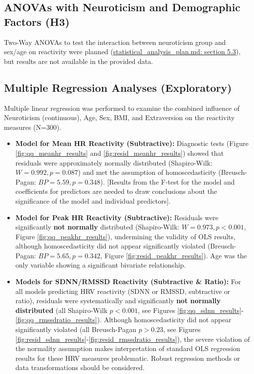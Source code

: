 \documentclass[11pt, a4paper]{report}
\newcommand{\mdcitesec}[2]{\href{run:./sources/#1}{\url{#1}: section #2}}
\begin{document}
\subsection{ANOVAs with Neuroticism and Demographic Factors (H3)}
\label{subsec:results_anova_add} %
Two-Way ANOVAs to test the interaction between neuroticism group and sex/age on reactivity were planned (\mdcitesec{statistical_analysis_plan.md}{5.3}), but results are not available in the provided data.

\subsection{Multiple Regression Analyses (Exploratory)}
\label{subsec:results_regression_add} %
Multiple linear regression was performed to examine the combined influence of Neuroticism (continuous), Age, Sex, BMI, and Extraversion on the reactivity measures (N=300).

\begin{itemize}
    \item \textbf{Model for Mean HR Reactivity (Subtractive):} Diagnostic tests (Figure \ref{fig:qq_meanhr_results} and \ref{fig:resid_meanhr_results}) showed that residuals were approximately normally distributed (Shapiro-Wilk: $W=0.992, p=0.087$) and met the assumption of homoscedasticity (Breusch-Pagan: $BP=5.59, p=0.348$). [Results from the F-test for the model and coefficients for predictors are needed to draw conclusions about the significance of the model and individual predictors].
    \item \textbf{Model for Peak HR Reactivity (Subtractive):} Residuals were significantly \textbf{not normally} distributed (Shapiro-Wilk: $W=0.973, p<0.001$, Figure \ref{fig:qq_peakhr_results}), undermining the validity of OLS results, although homoscedasticity did not appear significantly violated (Breusch-Pagan: $BP=5.65, p=0.342$, Figure \ref{fig:resid_peakhr_results}). Age was the only variable showing a significant bivariate relationship.
    \item \textbf{Models for SDNN/RMSSD Reactivity (Subtractive \& Ratio):} For all models predicting HRV reactivity (SDNN or RMSSD, subtractive or ratio), residuals were systematically and significantly \textbf{not normally distributed} (all Shapiro-Wilk $p < 0.001$, see Figures \ref{fig:qq_sdnn_results}-\ref{fig:qq_rmssdratio_results}). Although homoscedasticity did not appear significantly violated (all Breusch-Pagan $p > 0.23$, see Figures \ref{fig:resid_sdnn_results}-\ref{fig:resid_rmssdratio_results}), the severe violation of the normality assumption makes interpretation of standard OLS regression results for these HRV measures problematic. Robust regression methods or data transformations should be considered.
\end{itemize}
\end{document}
